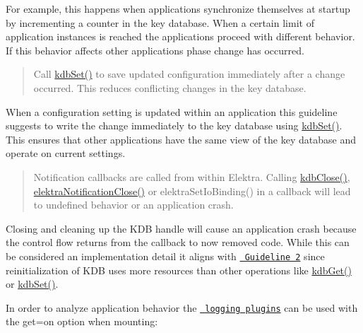 For example, this happens when applications synchronize themselves at startup by incrementing a counter in the key database. When a certain limit of application instances is reached the applications proceed with different behavior. If this behavior affects other applications phase change has occurred.

\begin{quote}
Call {\ttfamily \mbox{\hyperlink{group__kdb_ga11436b058408f83d303ca5e996832bcf}{kdb\+Set()}}} to save updated configuration immediately after a change occurred. This reduces conflicting changes in the key database. \end{quote}


When a configuration setting is updated within an application this guideline suggests to write the change immediately to the key database using {\ttfamily \mbox{\hyperlink{group__kdb_ga11436b058408f83d303ca5e996832bcf}{kdb\+Set()}}}. This ensures that other applications have the same view of the key database and operate on current settings.

\begin{quote}
Notification callbacks are called from within Elektra. Calling {\ttfamily \mbox{\hyperlink{group__kdb_gadb54dc9fda17ee07deb9444df745c96f}{kdb\+Close()}}}, {\ttfamily \mbox{\hyperlink{group__kdbnotification_ga5685dafbd4131011365628d6d9213594}{elektra\+Notification\+Close()}}} or {\ttfamily elektra\+Set\+Io\+Binding()} in a callback will lead to undefined behavior or an application crash. \end{quote}


Closing and cleaning up the K\+DB handle will cause an application crash because the control flow returns from the callback to now removed code. While this can be considered an implementation detail it aligns with \href{\#guidline-2-wait-before-reacting-to-changes}{\texttt{ Guideline 2}} since reinitialization of K\+DB uses more resources than other operations like {\ttfamily \mbox{\hyperlink{group__kdb_ga28e385fd9cb7ccfe0b2f1ed2f62453a1}{kdb\+Get()}}} or {\ttfamily \mbox{\hyperlink{group__kdb_ga11436b058408f83d303ca5e996832bcf}{kdb\+Set()}}}.

In order to analyze application behavior the \href{https://www.libelektra.org/plugins/readme\#notification-and-logging}{\texttt{ logging plugins}} can be used with the {\ttfamily get=on} option when mounting\+:


\begin{DoxyCode}{0}
\end{DoxyCode}


